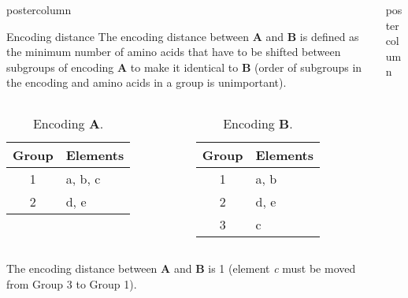 \documentclass[final]{beamer}\usepackage[]{graphicx}\usepackage[]{color}
\newlength{\columnheight}
\begin{document}
\begin{frame}
\begin{columns}
\begin{column}{.50\textwidth}
\begin{beamercolorbox}[center,wd=\textwidth]{postercolumn}
\begin{minipage}[T]{.95\textwidth}
{\begin{block}{Encoding distance}
The encoding distance between \textbf{A} and \textbf{B} is defined as the minimum number of amino acids that have to be shifted between subgroups of encoding \textbf{A} to make it identical to \textbf{B} (order of subgroups in the encoding and amino acids in a group is unimportant).

\begin{columns}
\begin{table}[ht]
\centering
\begin{tabular}{c|l}
  \toprule
Group & Elements \\ 
  \midrule
1 & a, b, c \\ 
   \rowcolor[gray]{0.75}2 & d, e \\ 
   \bottomrule
\end{tabular}
\caption{Encoding \textbf{A}.} 
\end{table}


\begin{table}[ht]
\centering
\begin{tabular}{c|l}
  \toprule
Group & Elements \\ 
  \midrule
1 & a, b \\ 
   \rowcolor[gray]{0.75}2 & d, e \\ 
  3 & c \\ 
   \bottomrule
\end{tabular}
\caption{Encoding \textbf{B}.} 
\end{table}

\end{columns}

The encoding distance between \textbf{A} and \textbf{B} is 1 (element \textit{c} must be moved from Group 3 to Group 1).

\end{block}
\vfill



}
\end{minipage}
\end{beamercolorbox}
\end{column}



\begin{column}{.50\textwidth}
\begin{beamercolorbox}[center,wd=\textwidth]{postercolumn}
\begin{minipage}[T]{.95\textwidth}  
\parbox[t][\columnheight]{\textwidth}
{




}
\end{minipage}
\end{beamercolorbox}
\end{column}
\end{columns}
\end{frame}
\end{document}
